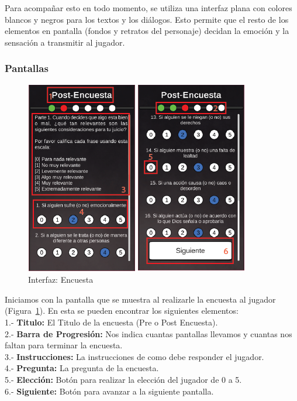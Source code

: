 Para acompañar esto en todo momento, se utiliza una interfaz plana con colores blancos y negros para los textos y los diálogos. Esto permite que el resto de los elementos en pantalla (fondos y retratos del personaje) decidan la emoción y la sensación a transmitir al jugador.


\newpage
\subsubsection{Pantallas}\label{sec:pantallas}
\begin{figure}[ht]
    \centering
    \includegraphics{imgs/hud-encuesta.png}
    \caption{Interfaz: Encuesta}
    \label{fig:hud-encuesta}
\end{figure}

Iniciamos con la pantalla que se muestra al realizarle la encuesta al jugador (Figura~\ref{fig:hud-encuesta}). En esta se pueden encontrar los siguientes elementos:\\
1.- \textbf{Titulo:} El Titulo de la encuesta (Pre o Post Encuesta).\\
2.- \textbf{Barra de Progresión:} Nos indica cuantas pantallas llevamos y cuantas nos faltan para terminar la encuesta.\\
3.- \textbf{Instrucciones:} La instrucciones de como debe responder el jugador.\\
4.- \textbf{Pregunta:} La pregunta de la encuesta.\\
5.- \textbf{Elección:} Botón para realizar la elección del jugador de 0 a 5.\\
6.- \textbf{Siguiente:} Botón para avanzar a la siguiente pantalla.

